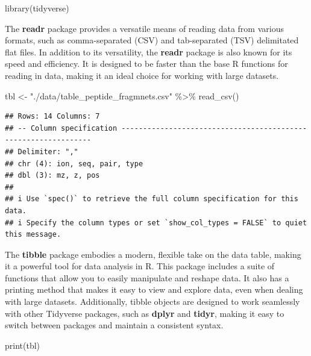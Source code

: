\documentclass[
]{book}
\newenvironment{Shaded}{\begin{snugshade}}{\end{snugshade}}
\newcommand{\FunctionTok}[1]{\textcolor[rgb]{0.00,0.00,0.00}{#1}}
\newcommand{\NormalTok}[1]{#1}
\newcommand{\OtherTok}[1]{\textcolor[rgb]{0.56,0.35,0.01}{#1}}
\newcommand{\SpecialCharTok}[1]{\textcolor[rgb]{0.00,0.00,0.00}{#1}}
\newcommand{\StringTok}[1]{\textcolor[rgb]{0.31,0.60,0.02}{#1}}
\begin{document}
\begin{Shaded}
\begin{Highlighting}[]
\FunctionTok{library}\NormalTok{(tidyverse)}
\end{Highlighting}
\end{Shaded}

The \textbf{readr} package provides a versatile means of reading data from various formats, such as comma-separated (CSV) and tab-separated (TSV) delimitated flat files. In addition to its versatility, the \textbf{readr} package is also known for its speed and efficiency. It is designed to be faster than the base R functions for reading in data, making it an ideal choice for working with large datasets.

\begin{Shaded}
\begin{Highlighting}[]
\NormalTok{tbl }\OtherTok{\textless{}{-}} \StringTok{"./data/table\_peptide\_fragmnets.csv"} \SpecialCharTok{\%\textgreater{}\%} \FunctionTok{read\_csv}\NormalTok{()}
\end{Highlighting}
\end{Shaded}

\begin{verbatim}
## Rows: 14 Columns: 7
## -- Column specification ---------------------------------------------------------------
## Delimiter: ","
## chr (4): ion, seq, pair, type
## dbl (3): mz, z, pos
## 
## i Use `spec()` to retrieve the full column specification for this data.
## i Specify the column types or set `show_col_types = FALSE` to quiet this message.
\end{verbatim}

The \textbf{tibble} package embodies a modern, flexible take on the data table, making it a powerful tool for data analysis in R. This package includes a suite of functions that allow you to easily manipulate and reshape data. It also has a printing method that makes it easy to view and explore data, even when dealing with large datasets. Additionally, tibble objects are designed to work seamlessly with other Tidyverse packages, such as \textbf{dplyr} and \textbf{tidyr}, making it easy to switch between packages and maintain a consistent syntax.

\begin{Shaded}
\begin{Highlighting}[]
\FunctionTok{print}\NormalTok{(tbl)}
\end{Highlighting}
\end{Shaded}
\end{document}

